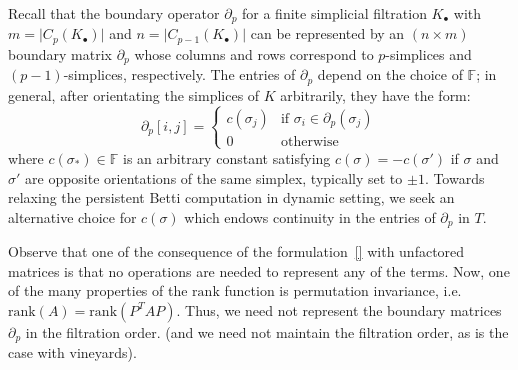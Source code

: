\documentclass[10pt]{article}
\begin{document}
Recall that the boundary operator $\partial_p$ for a finite simplicial filtration $K_{\bullet}$ with $m = \lvert C_p(K_{\bullet}) \rvert$ and $n = \lvert C_{p-1}(K_{\bullet}) \rvert$ can be represented by an $(n \times m)$ boundary matrix $\partial_p$ whose columns and rows correspond to $p$-simplices and $(p-1)$-simplices, respectively. The entries of $\partial_p$ depend on the choice of $\mathbb{F}$; in general, after orientating the simplices of $K$ arbitrarily, they have the form: 
\begin{equation}\label{eq:matrix_pchain}
	\partial_p[i, j] = \begin{cases} 
	c(\sigma_j)  & \text{if } \sigma_i \in \partial_p(\sigma_j) \\
	0 & \text{otherwise}
   \end{cases}
\end{equation}
where $c(\sigma_\ast) \in \mathbb{F}$ is an arbitrary constant satisfying $c(\sigma) = -c(\sigma')$ if $\sigma$ and $\sigma'$ are opposite orientations of the same simplex, typically set to $\pm 1$.  Towards relaxing the persistent Betti computation in dynamic setting, we seek an alternative choice for $c(\sigma)$ which endows continuity in the entries of $\partial_p$ in $T$.

Observe that one of the consequence of the formulation~\ref{} with unfactored matrices is that no operations are needed to represent any of the terms. Now, one of the many properties of the $\mathrm{rank}$ function is permutation invariance, i.e. $\mathrm{rank}(A) = \mathrm{rank}(P^T A P)$. Thus, we need not represent the boundary matrices $\partial_p$ in the filtration order. (and we need not maintain the filtration order, as is the case with vineyards). 
\end{document}
